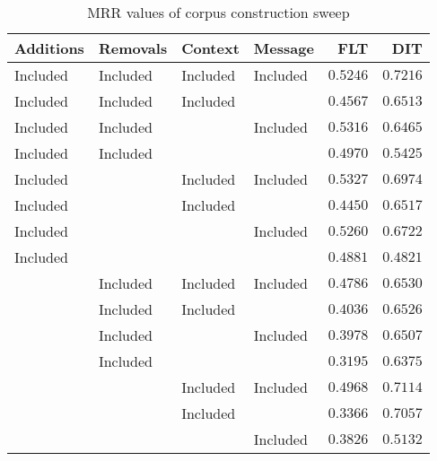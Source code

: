 
\begin{table}
\begin{spacing}{1.2}
\centering
\caption{MRR values of \bookkeeper corpus construction sweep}
\label{table:bookkeeper_corpus_sweep}
\vspace{0.2em}
\begin{tabular}{llll|rr}
\toprule
Additions &  Removals &   Context &   Message &           FLT &           DIT \\
\midrule
 Included &  Included &  Included &  Included &      $0.5246$ & $\bm{0.7216}$ \\
 \myrowcolor Included &  Included &  Included &           &      $0.4567$ &      $0.6513$ \\
 Included &  Included &           &  Included &      $0.5316$ &      $0.6465$ \\
 Included &  Included &           &           &      $0.4970$ &      $0.5425$ \\
 Included &           &  Included &  Included & $\bm{0.5327}$ &      $0.6974$ \\
 Included &           &  Included &           &      $0.4450$ &      $0.6517$ \\
 Included &           &           &  Included &      $0.5260$ &      $0.6722$ \\
 Included &           &           &           &      $0.4881$ &      $0.4821$ \\
          &  Included &  Included &  Included &      $0.4786$ &      $0.6530$ \\
          &  Included &  Included &           &      $0.4036$ &      $0.6526$ \\
          &  Included &           &  Included &      $0.3978$ &      $0.6507$ \\
          &  Included &           &           &      $0.3195$ &      $0.6375$ \\
          &           &  Included &  Included &      $0.4968$ &      $0.7114$ \\
          &           &  Included &           &      $0.3366$ &      $0.7057$ \\
          &           &           &  Included &      $0.3826$ &      $0.5132$ \\
\bottomrule
\end{tabular}

\end{spacing}
\end{table}
